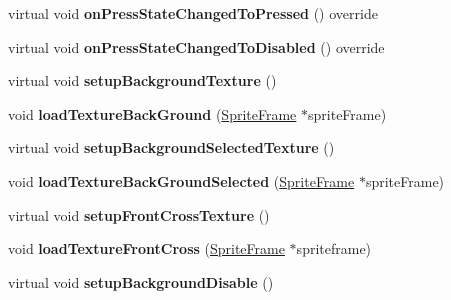 \begin{DoxyCompactItemize}
\item 
\mbox{\label{classui_1_1AbstractCheckButton_ae2bdb8c899181695155d534c196c69b8}} 
virtual void {\bfseries on\+Press\+State\+Changed\+To\+Pressed} () override
\item 
\mbox{\label{classui_1_1AbstractCheckButton_a58277c4ba2130d01aa0873330035fa80}} 
virtual void {\bfseries on\+Press\+State\+Changed\+To\+Disabled} () override
\item 
\mbox{\label{classui_1_1AbstractCheckButton_a5694ac83d2639c22efc63cdfee19cb4a}} 
virtual void {\bfseries setup\+Background\+Texture} ()
\item 
\mbox{\label{classui_1_1AbstractCheckButton_aab03d9617db3263453bf660f2b1b3828}} 
void {\bfseries load\+Texture\+Back\+Ground} (\hyperlink{classSpriteFrame}{Sprite\+Frame} $\ast$sprite\+Frame)
\item 
\mbox{\label{classui_1_1AbstractCheckButton_adf0a1953f49e551f2ea8aadf9f994a7e}} 
virtual void {\bfseries setup\+Background\+Selected\+Texture} ()
\item 
\mbox{\label{classui_1_1AbstractCheckButton_aad9a5587fe9c73fa7797f53826cef95f}} 
void {\bfseries load\+Texture\+Back\+Ground\+Selected} (\hyperlink{classSpriteFrame}{Sprite\+Frame} $\ast$sprite\+Frame)
\item 
\mbox{\label{classui_1_1AbstractCheckButton_ac97e8bbc20f910730a1392d1588509f0}} 
virtual void {\bfseries setup\+Front\+Cross\+Texture} ()
\item 
\mbox{\label{classui_1_1AbstractCheckButton_ace6534b9e2814b64e61330ee05c86d94}} 
void {\bfseries load\+Texture\+Front\+Cross} (\hyperlink{classSpriteFrame}{Sprite\+Frame} $\ast$spriteframe)
\item 
\mbox{\label{classui_1_1AbstractCheckButton_a67c9bfc062113950ee530d70437e5ee9}} 
virtual void {\bfseries setup\+Background\+Disable} ()
\item 

\end{DoxyCompactItemize}
